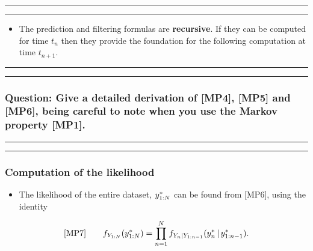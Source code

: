 \documentclass[]{article}
\providecommand{\tightlist}{%
  \setlength{\itemsep}{0pt}\setlength{\parskip}{0pt}}
\begin{document}
\begin{center}\rule{0.5\linewidth}{\linethickness}\end{center}

\begin{center}\rule{0.5\linewidth}{\linethickness}\end{center}

\begin{itemize}
\tightlist
\item
  The prediction and filtering formulas are \textbf{recursive}. If they
  can be computed for time \(t_n\) then they provide the foundation for
  the following computation at time \(t_{n+1}\).
\end{itemize}

\begin{center}\rule{0.5\linewidth}{\linethickness}\end{center}

\begin{center}\rule{0.5\linewidth}{\linethickness}\end{center}

\subsubsection{Question: Give a detailed derivation of {[}MP4{]},
{[}MP5{]} and {[}MP6{]}, being careful to note when you use the Markov
property
{[}MP1{]}.}\label{question-give-a-detailed-derivation-of-mp4-mp5-and-mp6-being-careful-to-note-when-you-use-the-markov-property-mp1.}

\begin{center}\rule{0.5\linewidth}{\linethickness}\end{center}

\begin{center}\rule{0.5\linewidth}{\linethickness}\end{center}

\subsubsection{Computation of the
likelihood}\label{computation-of-the-likelihood}

\begin{itemize}
\tightlist
\item
  The likelihood of the entire dataset, \(y_{1:N}^*\) can be found
  from {[}MP6{]}, using the identity
\end{itemize}

$$\text{[MP7]}
\quad\quad\displaystyle f_{Y_{1:N}}(y_{1:N}^*) = \prod_{n=1}^N f_{Y_{n}|Y_{1:n-1}}(y_n^*{\, | \,} y_{1:n-1}^*).$$
\end{document}
